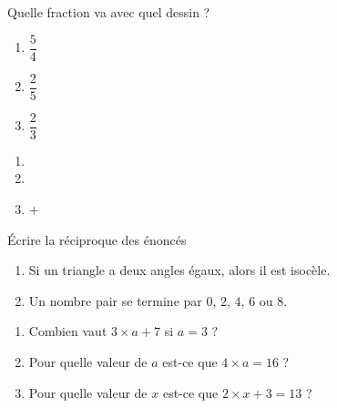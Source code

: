 \begin{MentalActivity}
    \begin{mental}
        Quelle fraction va avec quel dessin ?
        \begin{multicols}{2}
            \begin{enumerate}
                \item
                    \( \dfrac{ 5 }{ 4 }\)
                \item
                    \( \dfrac{ 2 }{ 5 }\)
                \item
                    \( \dfrac{ 2 }{ 3 }\)
            \end{enumerate}

            \columnbreak

            \begin{enumerate}
   \item
   
                \item
   
   \item
   \( +\)
            \end{enumerate}

        \end{multicols}
    \end{mental}

    \begin{mental}
        Écrire la réciproque des énoncés
        \begin{enumerate}
            \item
                Si un triangle a deux angles égaux, alors il est isocèle.
            \item
            Un nombre pair se termine par \( 0\), \( 2\), \( 4\), \( 6\) ou \( 8\).
        \end{enumerate}
    \end{mental}

    \begin{mental}
        \begin{enumerate}
            \item
                Combien vaut \( 3\times a+7\) si \( a=3\) ?
            \item
                Pour quelle valeur de \( a\) est-ce que \( 4\times a=16\) ?
            \item
                Pour quelle valeur de \( x\) est-ce que \( 2\times x+3=13\) ?
        \end{enumerate}
    \end{mental}
    
\end{MentalActivity}

